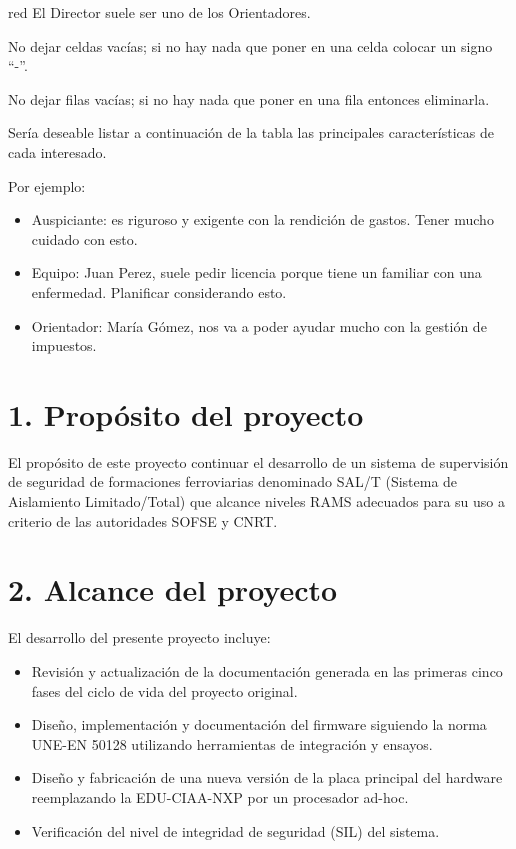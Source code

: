 \documentclass[11pt]{charter}
\begin{document}
\begin{consigna}{red}
El Director suele ser uno de los Orientadores.

No dejar celdas vacías; si no hay nada que poner en una celda colocar un signo ``-''.

No dejar filas vacías; si no hay nada que poner en una fila entonces eliminarla.

Sería deseable listar a continuación de la tabla las principales características de cada interesado.
 
Por ejemplo:
\begin{itemize}
\item Auspiciante: es riguroso y exigente con la rendición de gastos. Tener mucho cuidado con esto.
\item Equipo: Juan Perez, suele pedir licencia porque tiene un familiar con una enfermedad. Planificar considerando esto.
\item Orientador: María Gómez, nos va a poder ayudar mucho con la gestión de impuestos.
\end{itemize}

\end{consigna}

\newpage

\section{1. Propósito del proyecto}
\label{sec:proposito}

El propósito de este proyecto continuar el desarrollo de un sistema de supervisión de seguridad de formaciones ferroviarias 
denominado SAL/T (Sistema de Aislamiento Limitado/Total) que alcance niveles RAMS adecuados para su uso a criterio de las autoridades SOFSE y CNRT.

\section{2. Alcance del proyecto}
\label{sec:alcance}

El desarrollo del presente proyecto incluye:

\begin{itemize}
\item Revisión y actualización de la documentación generada en las primeras cinco fases del ciclo de vida del proyecto
original.
\item Diseño, implementación y documentación del firmware siguiendo la norma UNE-EN 50128 utilizando herramientas de integración y ensayos. 
\item Diseño y fabricación de una nueva versión de la placa principal del hardware reemplazando la EDU-CIAA-NXP por un procesador ad-hoc.
\item Verificación del nivel de integridad de seguridad (SIL) del sistema.
\end{itemize}
\end{document}
